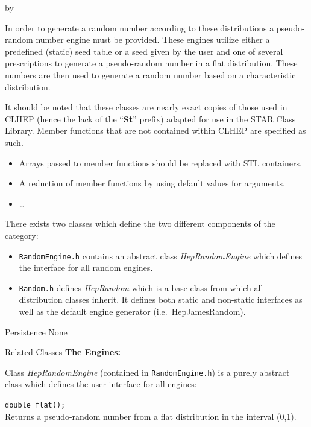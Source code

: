 \documentclass[twoside]{article}
\newcommand{\comp}[1]{\texttt{#1}}%
\newcommand{\entrylabel}[1]{\mbox{\textbf{{#1}}}\hfil}%
\newenvironment{entry}
{\begin{list}{}%
    {\renewcommand{\makelabel}{\entrylabel}%
     \setlength{\labelwidth}{90pt}%
     \setlength{\leftmargin}{\labelwidth}
     \advance\leftmargin by \labelsep%
      }%
    }%
  {\end{list}}
\newcommand{\Entrylabel}[1]%
{\raisebox{0pt}[1ex][0pt]{\makebox[\labelwidth][l]%
    {\parbox[t]{\labelwidth}{\hspace{0pt}\textbf{{#1}}}}}}
\newenvironment{Entry}%
{\renewcommand{\entrylabel}{\Entrylabel}\begin{entry}}%
  {\end{entry}}
\begin{document}
\begin{Entry}
  In order to generate a random number according to these distributions
  a pseudo-random number engine must be provided.  These engines
  utilize either a predefined (static) seed table 
  or a seed given by the user and one of several prescriptions
  to generate a pseudo-random
  number in a flat distribution.  These numbers are then used to generate
  a random number based on a characteristic distribution.
  
  It should be noted that these classes are nearly exact copies of those
  used in CLHEP (hence the lack of the ``{\bf St}'' prefix)
  adapted for use in the STAR Class Library.  Member functions that
  are not contained within CLHEP are specified as such.
  
  \begin{itemize}
    \item Arrays passed to member functions should be replaced with
      STL containers.
    \item A reduction of member functions by using default values for
      arguments.
    \item \ldots
  \end{itemize}
  
  There exists two classes which define the two different components
  of the category:
  \begin{itemize}
    \item \comp{RandomEngine.h} contains an abstract class {\em HepRandomEngine}
      which defines the interface for all random engines.
    \item \comp{Random.h} defines  {\em HepRandom} which is a base class
      from which all distribution classes inherit.  It defines both
      static and non-static interfaces as well as the default engine
      generator (i.e.~HepJamesRandom).
    \end{itemize}
    
\item[Persistence]
    None

\item[Related Classes]
  {\bf The Engines:}
  
    Class {\em HepRandomEngine} (contained in \comp{RandomEngine.h}) is a purely
    abstract class which defines the user interface for all engines:

     \verb+double flat();+\\
     Returns a pseudo-random number from a flat distribution
     in the interval (0,1).


\end{Entry}
\end{document}
